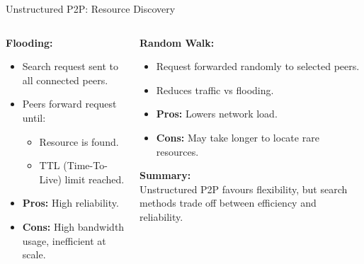 \documentclass[aspectratio=169, table]{beamer}
\begin{document}
\begin{frame}{Unstructured P2P: Resource Discovery}
	\vspace{20pt}
	\begin{columns}[t]
		
		\begin{column}{0.5\textwidth}
			\textbf{Flooding:}
			\begin{itemize}
				\item Search request sent to all connected peers.
				\item Peers forward request until:
				\begin{itemize}
					\item Resource is found.
					\item TTL (Time-To-Live) limit reached.
				\end{itemize}
				\item \textbf{Pros:} High reliability.
				\item \textbf{Cons:} High bandwidth usage, inefficient at scale.
			\end{itemize}
		\end{column}
		
		\begin{column}{0.5\textwidth}
			\textbf{Random Walk:}
			\begin{itemize}
				\item Request forwarded randomly to selected peers.
				\item Reduces traffic vs flooding.
				\item \textbf{Pros:} Lowers network load.
				\item \textbf{Cons:} May take longer to locate rare resources.
			\end{itemize}
			
			\vspace{10pt}
			\textbf{Summary:} \\
			Unstructured P2P favours flexibility, but search methods trade off between efficiency and reliability.
		\end{column}
		
	\end{columns}
\end{frame}
\end{document}
